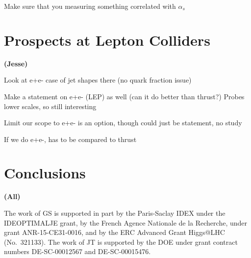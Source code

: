 \documentclass[11pt,letterpaper]{article}
\newcommand{\info}[1]{\textbf{\textcolor{mildred}{(#1)}}}
\begin{document}
Make sure that you measuring something correlated with $\alpha_s$



\section{Prospects at Lepton Colliders}

\info{Jesse}

	Look at e+e- case of jet shapes there (no quark fraction issue)

	Make a statement on e+e- (LEP) as well (can it do better than thrust?)
		Probes lower scales, so still interesting

	Limit our scope to e+e- is an option, though could just be statement, no study

	If we do e+e-, has to be compared to thrust

\section{Conclusions}

\info{All}

\begin{acknowledgments}

The work of GS is supported in part by the Paris-Saclay IDEX under the
IDEOPTIMALJE grant, by the French Agence Nationale de la Recherche,
under grant ANR-15-CE31-0016, and by the ERC Advanced Grant Higgs@LHC
(No.\ 321133).
%
The work of JT is supported by the DOE under grant contract numbers DE-SC-00012567 and DE-SC-00015476.

\end{acknowledgments}



\end{document}
